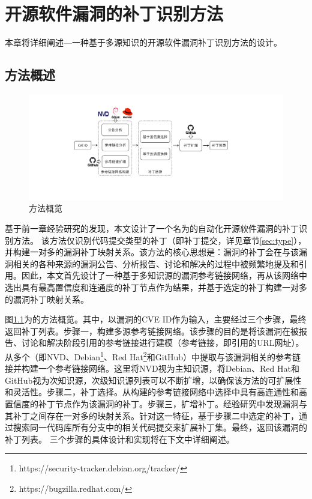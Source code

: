 
\chapter{开源软件漏洞的补丁识别方法}

本章将详细阐述\tool ---一种基于多源知识的开源软件漏洞补丁识别方法的设计。

\section{方法概述}
\begin{figure}[t]
    \centering
    \includegraphics[scale=0.5]{fig/overview.pdf}
    \caption{\tool 方法概览}\label{fig:overview}
\end{figure}

基于前一章经验研究的发现，本文设计了一个名为\tool 的自动化开源软件漏洞的补丁识别方法。
该方法仅识别代码提交类型的补丁（即补丁提交，详见章节\ref{sec:type}），并构建一对多的漏洞补丁映射关系。该方法的核心思想是：漏洞的补丁会在与该漏洞相关的各种来源的漏洞公告、分析报告、讨论和解决的过程中被频繁地提及和引用。因此，本文首先设计了一种基于多知识源的漏洞参考链接网络，再从该网络中选出具有最高置信度和连通度的补丁节点作为结果，并基于选定的补丁构建一对多的漏洞补丁映射关系。

图\ref{fig:overview}为\tool 的方法概览。其中，\tool 以漏洞的CVE ID作为输入，主要经过三个步骤，最终返回补丁列表。步骤一，构建多源参考链接网络。该步骤的目的是将该漏洞在被报告、讨论和解决阶段引用的参考链接进行建模（参考链接，即引用的URL网址）。\tool 从多个（即NVD、Debian\footnote{https://security-tracker.debian.org/tracker/}、Red Hat\footnote{https://bugzilla.redhat.com/}和GitHub）中提取与该漏洞相关的参考链接并构建一个参考链接网络。这里将NVD视为主知识源，将Debian、Red Hat和GitHub视为次知识源，次级知识源列表可以不断扩增，以确保该方法的可扩展性和灵活性。步骤二，补丁选择。\tool 从构建的参考链接网络中选择中具有高连通性和高置信度的补丁节点作为该漏洞的补丁。步骤三，扩增补丁。经验研究中发现漏洞与其补丁之间存在一对多的映射关系。针对这一特征，基于步骤二中选定的补丁，\tool 通过搜索同一代码库所有分支中的相关代码提交来扩展补丁集。最终，\tool 返回该漏洞的补丁列表。
三个步骤的具体设计和实现将在下文中详细阐述。

